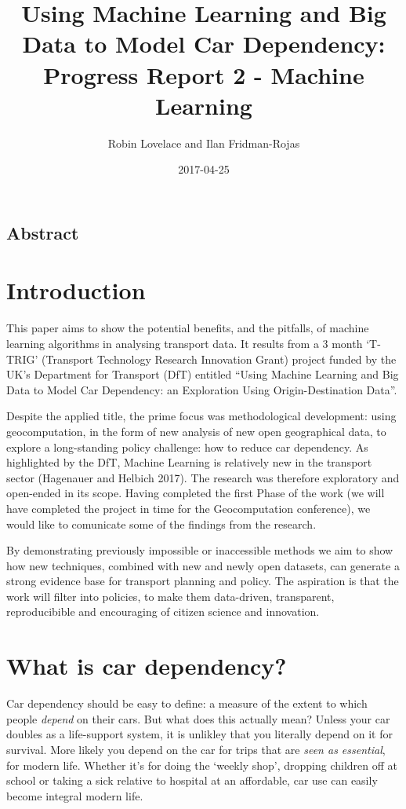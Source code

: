 \documentclass[]{article}
\title{Using Machine Learning and Big Data to Model Car Dependency: Progress
Report 2 - Machine Learning}
\author{Robin Lovelace and Ilan Fridman-Rojas}
\date{2017-04-25}
\begin{document}
\maketitle

\subsection{Abstract}\label{abstract}

\section{Introduction}\label{introduction}

This paper aims to show the potential benefits, and the pitfalls, of
machine learning algorithms in analysing transport data. It results from
a 3 month `T-TRIG' (Transport Technology Research Innovation Grant)
project funded by the UK's Department for Transport (DfT) entitled
``Using Machine Learning and Big Data to Model Car Dependency: an
Exploration Using Origin-Destination Data''.

Despite the applied title, the prime focus was methodological
development: using geocomputation, in the form of new analysis of new
open geographical data, to explore a long-standing policy challenge: how
to reduce car dependency. As highlighted by the DfT, Machine Learning is
relatively new in the transport sector (Hagenauer and Helbich 2017). The
research was therefore exploratory and open-ended in its scope. Having
completed the first Phase of the work (we will have completed the
project in time for the Geocomputation conference), we would like to
comunicate some of the findings from the research.

By demonstrating previously impossible or inaccessible methods we aim to
show how new techniques, combined with new and newly open datasets, can
generate a strong evidence base for transport planning and policy. The
aspiration is that the work will filter into policies, to make them
data-driven, transparent, reproducibible and encouraging of citizen
science and innovation.

\section{What is car dependency?}\label{what-is-car-dependency}

Car dependency should be easy to define: a measure of the extent to
which people \emph{depend} on their cars. But what does this actually
mean? Unless your car doubles as a life-support system, it is unlikley
that you literally depend on it for survival. More likely you depend on
the car for trips that are \emph{seen as essential}, for modern life.
Whether it's for doing the `weekly shop', dropping children off at
school or taking a sick relative to hospital at an affordable, car use
can easily become integral modern life.
\end{document}

